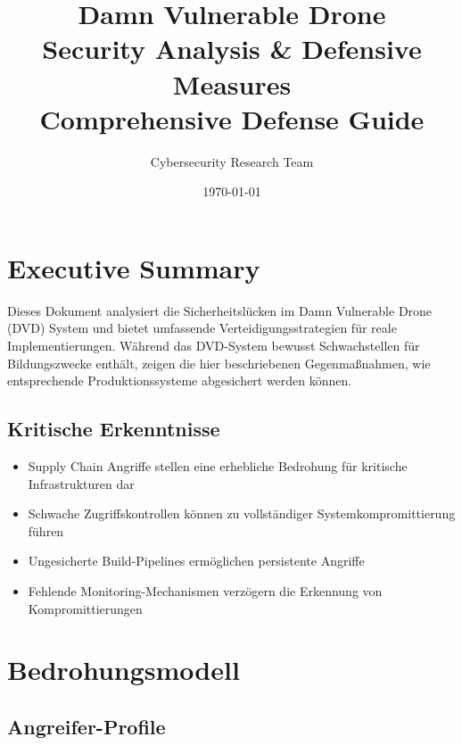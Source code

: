 \documentclass[11pt,a4paper]{article}
\begin{document}
\title{\textbf{Damn Vulnerable Drone} \\ Security Analysis \& Defensive Measures \\ \large{Comprehensive Defense Guide}}
\author{Cybersecurity Research Team}
\date{\today}

\maketitle

\tableofcontents
\newpage

\section{Executive Summary}

Dieses Dokument analysiert die Sicherheitslücken im Damn Vulnerable Drone (DVD) System und bietet umfassende Verteidigungsstrategien für reale Implementierungen. Während das DVD-System bewusst Schwachstellen für Bildungszwecke enthält, zeigen die hier beschriebenen Gegenmaßnahmen, wie entsprechende Produktionssysteme abgesichert werden können.

\subsection{Kritische Erkenntnisse}

\begin{itemize}[leftmargin=*]
    \item Supply Chain Angriffe stellen eine erhebliche Bedrohung für kritische Infrastrukturen dar
    \item Schwache Zugriffskontrollen können zu vollständiger Systemkompromittierung führen
    \item Ungesicherte Build-Pipelines ermöglichen persistente Angriffe
    \item Fehlende Monitoring-Mechanismen verzögern die Erkennung von Kompromittierungen
\end{itemize}

\section{Bedrohungsmodell}

\subsection{Angreifer-Profile}
\end{document}
